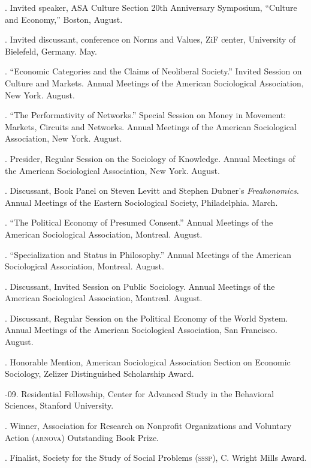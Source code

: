 \documentclass[11pt]{article}
\begin{document}
. Invited speaker, ASA Culture Section 20th Anniversary Symposium, ``Culture and Economy,'' Boston, August.

. Invited discussant, conference on Norms and Values, ZiF center, University of Bielefeld, Germany. May. 

. ``Economic Categories and the Claims of Neoliberal Society.'' Invited Session on Culture and Markets. Annual Meetings of the American Sociological Association, New York. August.

. ``The Performativity of Networks.'' Special Session on Money in Movement: Markets, Circuits and Networks. Annual Meetings of the American Sociological Association, New York. August.

. Presider, Regular Session on the Sociology of Knowledge. Annual Meetings of the American Sociological Association, New York. August.

. Discussant, Book Panel on Steven Levitt and Stephen Dubner's \emph{Freakonomics}. Annual Meetings of the Eastern Sociological Society, Philadelphia. March.

. ``The Political Economy of Presumed Consent.'' Annual Meetings of the American Sociological Association, Montreal. August.

. ``Specialization and Status in Philosophy.'' Annual Meetings of the American Sociological Association, Montreal. August.

. Discussant, Invited Session on Public Sociology. Annual Meetings of the American Sociological Association, Montreal. August.

. Discussant, Regular Session on the Political Economy of the World System. Annual Meetings of the American Sociological Association, San Francisco. August.


\bigskip

\medskip
  
. Honorable Mention, American Sociological Association Section on Economic Sociology, Zelizer Distinguished Scholarship Award.

-09. Residential Fellowship, Center for Advanced Study in the Behavioral Sciences, Stanford University.

. Winner, Association for Research on Nonprofit Organizations and Voluntary Action (\textsc{arnova}) Outstanding Book Prize.

. Finalist, Society for the Study of Social Problems (\textsc{sssp}), C. Wright Mills Award.
\end{document}
